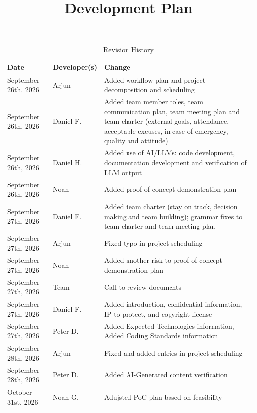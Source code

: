 \documentclass{article}
\title{Development Plan\\\progname}
\author{\authname}
\date{}
\begin{document}
\maketitle

\begin{table}[hp]
\caption{Revision History} \label{TblRevisionHistory}
\begin{tabularx}{\textwidth}{llX}
\toprule
\textbf{Date} & \textbf{Developer(s)} & \textbf{Change}\\
\midrule
September 26th, 2026 & Arjun & Added workflow plan and project decomposition and scheduling\\
September 26th, 2026 & Daniel F. & Added team member roles, team communication plan, team meeting plan and team charter (external goals, attendance, acceptable excuses, in case of emergency, quality and attitude)\\
September 26th, 2026 & Daniel H. & Added use of AI/LLMs: code development, documentation development and verification of LLM output\\
September 26th, 2026 & Noah & Added proof of concept demonstration plan\\
September 27th, 2026 & Daniel F. & Added team charter (stay on track, decision making and team building); grammar fixes to team charter and team meeting plan\\
September 27th, 2026 & Arjun & Fixed typo in project scheduling\\
September 27th, 2026 & Noah & Added another risk to proof of concept demonstration plan\\
September 27th, 2026 & Team & Call to review documents\\
September 27th, 2026 & Daniel F. & Added introduction, confidential information, IP to protect, and copyright license\\
September 27th, 2026 & Peter D. & Added Expected Technologies information, Added Coding Standards information\\
September 28th, 2026 & Arjun & Fixed and added entries in project scheduling\\
September 28th, 2026 & Peter D. & Added AI-Generated content verification\\
October 31st, 2026 & Noah G. & Adujsted PoC plan based on feasibility\\

\bottomrule
\end{tabularx}
\end{table}

\newpage{}
\end{document}
